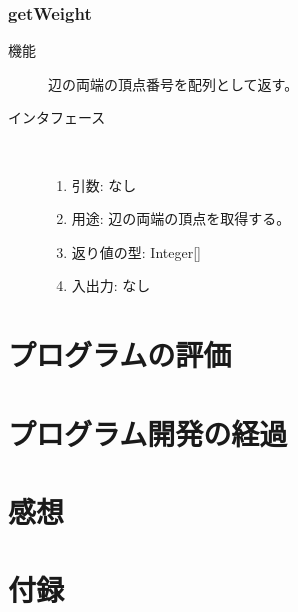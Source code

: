 \documentclass[a4j]{jarticle}
\begin{document}
\subsubsection{getWeight}

\begin{description}
\item[機能]
辺の両端の頂点番号を配列として返す。

\item[インタフェース]\ \vspace{0mm}
\begin{enumerate}
  \item 引数: なし
  \item 用途: 辺の両端の頂点を取得する。
  \item 返り値の型: Integer[]
  \item 入出力: なし
\end{enumerate}
\end{description}


\section{プログラムの評価}



\section{プログラム開発の経過}


\section{感想}


\newpage
\section*{付録}

\end{document}
